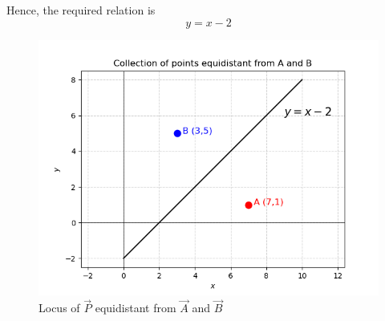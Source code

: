 \documentclass[12pt]{article}
\begin{document}
Hence, the required relation is
\[
\boxed{y = x - 2}
\]

\begin{figure}[H]\centering
\includegraphics[width=1\columnwidth]{figs/plt.png}
\caption{Locus of $\vec{P}$ equidistant from $\vec{A}$ and $\vec{B}$}
\label{fig:plt}
\end{figure}
\end{document}
